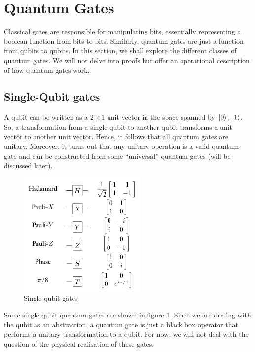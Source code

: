 \documentclass[conference]{IEEEtran}
\begin{document}
\section{Quantum Gates}
Classical gates are responsible for manipulating bits, essentially representing a boolean function from bits to bits.
Similarly, quantum gates are just a function from qubits to qubits. In this section, we shall explore the different classes of quantum gates. 
We will not delve into proofs but offer an operational description of how quantum gates work.
\subsection{Single-Qubit gates}
A qubit can be written as a $2 \times 1$ unit vector in the space spanned by $\ket*{0}, \ket*{1}$. So, a transformation from a single qubit to 
another qubit transforms a unit vector to another unit vector. Hence, it follows that all quantum gates are unitary. Moreover, it turns out that any 
unitary operation is a valid quantum gate and can be constructed from some ``universal'' quantum gates (will be discussed later).

\begin{figure}[htbp]
\centerline{\includegraphics[scale = 0.5]{Images/single-gates.png}}
\caption{Single qubit gates}
\label{singlegate}
\end{figure}

Some single qubit quantum gates are shown in figure \ref{singlegate}. Since we are dealing with the qubit as an abstraction, a quantum gate is just a black box 
operator that performs a unitary transformation to a qubit. For now, we will not deal with the question of the physical realisation of these gates. 
\end{document}
